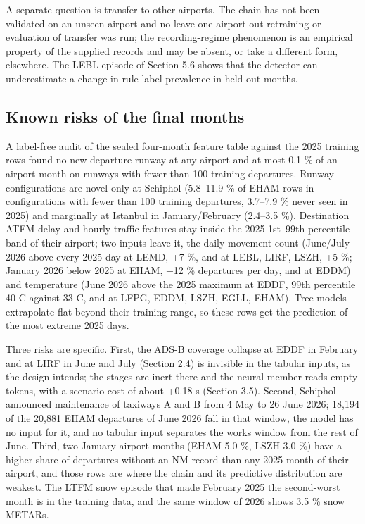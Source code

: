 \documentclass[
  manuscript=article,  %
  layout=preprint,     %
  year=2026,
  volume=4,
]{extra/joas}
\begin{document}
A separate question is transfer to other airports. The chain has not been validated on an unseen airport and no leave-one-airport-out retraining or evaluation of transfer was run; the recording-regime phenomenon is an empirical property of the supplied records and may be absent, or take a different form, elsewhere. The LEBL episode of Section 5.6 shows that the detector can underestimate a change in rule-label prevalence in held-out months.

\subsection{Known risks of the final months}\label{known-risks-of-the-final-months}

A label-free audit of the sealed four-month feature table against the 2025 training rows found no new departure runway at any airport and at most 0.1 \% of an airport-month on runways with fewer than 100 training departures. Runway configurations are novel only at Schiphol (5.8--11.9 \% of EHAM rows in configurations with fewer than 100 training departures, 3.7--7.9 \% never seen in 2025) and marginally at Istanbul in January/February (2.4--3.5 \%). Destination ATFM delay and hourly traffic features stay inside the 2025 1st--99th percentile band of their airport; two inputs leave it, the daily movement count (June/July 2026 above every 2025 day at LEMD, +7 \%, and at LEBL, LIRF, LSZH, +5 \%; January 2026 below 2025 at EHAM, $-$12 \% departures per day, and at EDDM) and temperature (June 2026 above the 2025 maximum at EDDF, 99th percentile 40 \textdegree{}C against 33 \textdegree{}C, and at LFPG, EDDM, LSZH, EGLL, EHAM). Tree models extrapolate flat beyond their training range, so these rows get the prediction of the most extreme 2025 days.

Three risks are specific. First, the ADS-B coverage collapse at EDDF in February and at LIRF in June and July (Section 2.4) is invisible in the tabular inputs, as the design intends; the stages are inert there and the neural member reads empty tokens, with a scenario cost of about +0.18 s (Section 3.5). Second, Schiphol announced maintenance of taxiways A and B from 4 May to 26 June 2026; 18,194 of the 20,881 EHAM departures of June 2026 fall in that window, the model has no input for it, and no tabular input separates the works window from the rest of June. Third, two January airport-months (EHAM 5.0 \%, LSZH 3.0 \%) have a higher share of departures without an NM record than any 2025 month of their airport, and those rows are where the chain and its predictive distribution are weakest. The LTFM snow episode that made February 2025 the second-worst month is in the training data, and the same window of 2026 shows 3.5 \% snow METARs.
\end{document}
